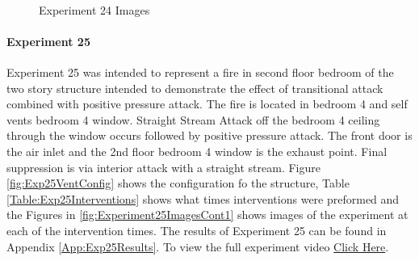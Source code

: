 \documentclass{article}
\begin{document}
\clearpage

\begin{figure}[H]
	\ContinuedFloat 
	\centering 
	 \ 
	\caption{Experiment 24 Images}
	\label{fig:Experiment24ImagesCont3} 
\end{figure}

\paragraph{Experiment 25}\mbox{}

Experiment 25 was intended to represent a fire in second floor bedroom of the two story structure intended to demonstrate the effect of transitional attack combined with positive pressure attack. The fire is located in bedroom 4 and self vents bedroom 4 window. Straight Stream Attack off the bedroom 4 ceiling through the window occurs followed by positive pressure attack. The front door is the air inlet and the 2nd floor bedroom 4 window is the exhaust point. Final suppression is via interior attack with a straight stream. Figure \ref{fig:Exp25VentConfig} shows the configuration fo the structure, Table \ref{Table:Exp25Interventions} shows what times interventions were preformed and the Figures in \ref{fig:Experiment25ImagesCont1} shows images of the experiment at each of the intervention times. The results of Experiment 25 can be found in Appendix \ref{App:Exp25Results}. To view the full experiment video \href{https://youtu.be/vMflFNnWxHU}{Click Here}.
\end{document}
